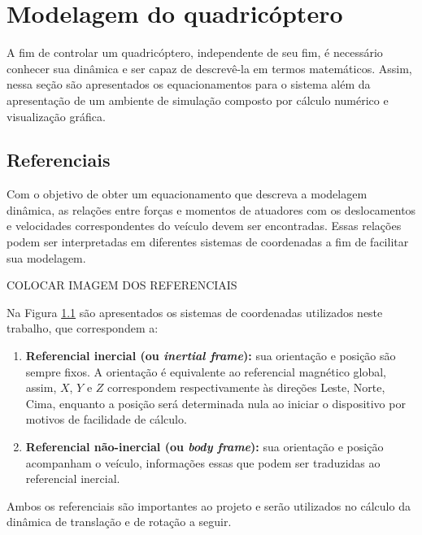 \documentclass[main.tex]{subfiles}
\begin{document}
\chapter{Modelagem do quadricóptero}
\label{chap:modelagem}


A fim de controlar um quadricóptero, independente de seu fim, é necessário conhecer sua dinâmica e ser capaz de descrevê-la em termos matemáticos. Assim, nessa seção são apresentados os equacionamentos para o sistema além da apresentação de um ambiente de simulação composto por cálculo numérico e visualização gráfica.

\section{Referenciais}


Com o objetivo de obter um equacionamento que descreva a modelagem dinâmica, as relações entre forças e momentos de atuadores com os deslocamentos e velocidades correspondentes do veículo devem ser encontradas. Essas relações podem ser interpretadas em diferentes sistemas de coordenadas a fim de facilitar sua modelagem. 

\textcolor{corrigir}{COLOCAR IMAGEM DOS REFERENCIAIS}

Na Figura \ref{} são apresentados os sistemas de coordenadas utilizados neste trabalho, que correspondem a:

\begin{enumerate}
    \item \textbf{Referencial inercial (ou \textit{inertial frame}):} sua orientação e posição são sempre fixos. A orientação é equivalente ao referencial magnético global, assim, $X$, $Y$ e $Z$ correspondem respectivamente às direções Leste, Norte, Cima, enquanto a posição será determinada nula ao iniciar o dispositivo por motivos de facilidade de cálculo.
    \item \textbf{Referencial não-inercial (ou \textit{body frame}):} sua orientação e posição acompanham o veículo, informações essas que podem ser traduzidas ao referencial inercial.
\end{enumerate}

Ambos os referenciais são importantes ao projeto e serão utilizados no cálculo da dinâmica de translação e de rotação a seguir.
\end{document}

